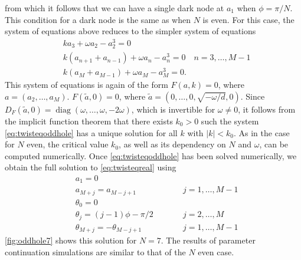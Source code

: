 \documentclass[reprint, amsmath,amssymb,aps,pra]{revtex4-2}
\DeclareMathOperator{\diag}{diag}
\begin{document}
from which it follows that we can have a single dark node at $a_1$ when $\phi = \pi/N$. This condition for a dark node is the same as when $N$ is even. For this case, the system of equations above reduces to the simpler system of equations
\begin{equation}\label{eq:twisteqoddhole}
\begin{aligned}
& k a_3 + \omega a_2 - a_2^3 = 0\\
&k( a_{n+1} + a_{n-1} ) + \omega a_n - a_n^3 = 0 \quad n = 3, \dots, M-1 \\
&k ( a_M + a_{M-1} ) + \omega a_M - a_M^3 = 0.
\end{aligned}
\end{equation}
This system of equations is again of the form $F(a,k) = 0$, where $a = (a_2, \dots, a_M)$. $F(\tilde{a}, 0) = 0$, where $\tilde{a} = (0, \dots, 0, \sqrt{-\omega/d}, 0)$. Since $D_F(\tilde{a}, 0) = \diag(\omega, \dots, \omega, -2\omega)$, which is invertible for $\omega \neq 0$, it follows from the implicit function theorem that there exists $k_0 > 0$ such the system \cref{eq:twisteqoddhole} has a unique solution for all $k$ with $|k| < k_0$. As in the case for $N$ even, the critical value $k_0$, as well as its dependency on $N$ and $\omega$, can be computed numerically. Once \cref{eq:twisteqoddhole} has been solved numerically, we obtain the full solution to \cref{eq:twisteqreal} using
\begin{align*}
&a_1 = 0 \\
&a_{M+j} = a_{M-j+1} && \qquad j = 1, \dots, M-1 \\
&\theta_0 = 0 \\
&\theta_j = (j-1)\phi - \pi/2 && \qquad j = 2, \dots, M \\
&\theta_{M+j} = -\theta_{M-j+1} && \qquad j = 1, \dots, M-1
\end{align*}
\cref{fig:oddhole7} shows this solution for $N=7$. The results of parameter continuation simulations are similar to that of the $N$ even case.
\end{document}
